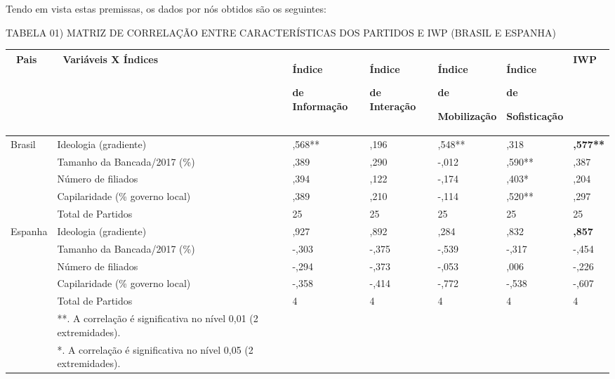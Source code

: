 Tendo em vista estas premissas, os dados por nós obtidos são os
seguintes:

TABELA 01) MATRIZ DE CORRELAÇÃO ENTRE CARACTERÍSTICAS DOS PARTIDOS E IWP
(BRASIL E ESPANHA)

\begin{longtable}[]{@{}lllllll@{}}
\toprule
\begin{minipage}[b]{0.14\columnwidth}\raggedright\strut
\textbf{~Pais}\strut
\end{minipage} & \begin{minipage}[b]{0.14\columnwidth}\raggedright\strut
\textbf{~Variáveis X Índices}\strut
\end{minipage} & \begin{minipage}[b]{0.14\columnwidth}\raggedright\strut
\textbf{Índice }

\textbf{de Informação}\strut
\end{minipage} & \begin{minipage}[b]{0.14\columnwidth}\raggedright\strut
\textbf{Índice }

\textbf{de Interação}\strut
\end{minipage} & \begin{minipage}[b]{0.14\columnwidth}\raggedright\strut
\textbf{Índice }

\textbf{de}

\textbf{Mobilização}\strut
\end{minipage} & \begin{minipage}[b]{0.14\columnwidth}\raggedright\strut
\textbf{Índice }

\textbf{de }

\textbf{Sofisticação}\strut
\end{minipage} & \begin{minipage}[b]{0.14\columnwidth}\raggedright\strut
\textbf{IWP}\strut
\end{minipage}\tabularnewline
\midrule
\endhead
Brasil & Ideologia (gradiente) & ,568** & ,196 & ,548** & ,318 &
\textbf{,577**}\tabularnewline
& Tamanho da Bancada/2017 (\%) & ,389 & ,290 & -,012 & ,590** &
,387\tabularnewline
& Número de filiados & ,394 & ,122 & -,174 & ,403* & ,204\tabularnewline
& Capilaridade (\% governo local) & ,389 & ,210 & -,114 & ,520** &
,297\tabularnewline
& Total de Partidos & 25 & 25 & 25 & 25 & 25\tabularnewline
Espanha & Ideologia (gradiente) & ,927 & ,892 & ,284 & ,832 &
\textbf{,857}\tabularnewline
& Tamanho da Bancada/2017 (\%) & -,303 & -,375 & -,539 & -,317 &
-,454\tabularnewline
& Número de filiados & -,294 & -,373 & -,053 & ,006 &
-,226\tabularnewline
& Capilaridade (\% governo local) & -,358 & -,414 & -,772 & -,538 &
-,607\tabularnewline
& Total de Partidos & 4 & 4 & 4 & 4 & 4\tabularnewline
~ & **. A correlação é significativa no nível 0,01 (2
extremidades).\tabularnewline
~ & *. A correlação é significativa no nível 0,05 (2
extremidades).\tabularnewline
\bottomrule
\end{longtable}

